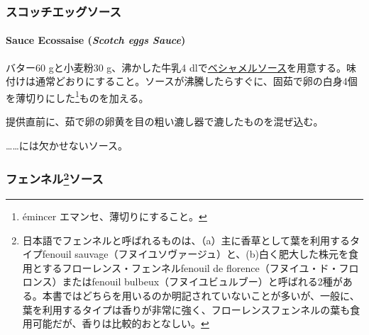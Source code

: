 \begin{recette}
\maeaki

\hypertarget{ux30b9ux30b3ux30c3ux30c1ux30a8ux30c3ux30b0ux30bdux30fcux30b9}{%
\subsubsection{スコッチエッグソース}\label{ux30b9ux30b3ux30c3ux30c1ux30a8ux30c3ux30b0ux30bdux30fcux30b9}}

\hypertarget{scotch-eggs-sauce}{%
\paragraph{\texorpdfstring{Sauce Ecossaise (\emph{Scotch eggs
Sauce})}{Sauce Ecossaise (Scotch eggs Sauce)}}\label{scotch-eggs-sauce}}


バター60 gと小麦粉30 g、沸かした牛乳4
dlで\protect\hyperlink{sauce-bechamel}{ベシャメルソース}を用意する。味付けは通常どおりにすること。ソースが沸騰したらすぐに、固茹で卵の白身4個を薄切りにした\footnote{émincer
  エマンセ、薄切りにすること。}ものを加える。

提供直前に、茹で卵の卵黄を目の粗い漉し器で漉したものを混ぜ込む。

\ldots{}\ldots{}には欠かせないソース。

\maeaki

\hypertarget{ux30d5ux30a7ux30f3ux30cdux30eb30ux30bdux30fcux30b9}{%
\subsubsection[フェンネルソース]{\texorpdfstring{フェンネル\footnote{日本語でフェンネルと呼ばれるものは、（a）主に香草として葉を利用するタイプfenouil
  sauvage（フヌイユソヴァージュ）と、(b)白く肥大した株元を食用とするフローレンス・フェンネルfenouil
  de florence（フヌイユ・ド・フロロンス）またはfenouil
  bulbeux（フヌイユビュルブー）と呼ばれる2種がある。本書ではどちらを用いるのか明記されていないことが多いが、一般に、葉を利用するタイプは香りが非常に強く、フローレンスフェンネルの葉も食用可能だが、香りは比較的おとなしい。}ソース}{フェンネルソース}}\label{ux30d5ux30a7ux30f3ux30cdux30eb30ux30bdux30fcux30b9}}


\end{recette}
